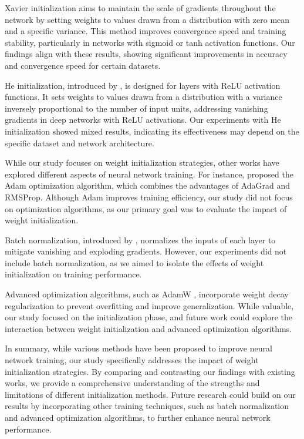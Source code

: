 \documentclass{article} %
\begin{document}
Xavier initialization aims to maintain the scale of gradients throughout the network by setting weights to values drawn from a distribution with zero mean and a specific variance. This method improves convergence speed and training stability, particularly in networks with sigmoid or tanh activation functions. Our findings align with these results, showing significant improvements in accuracy and convergence speed for certain datasets.

He initialization, introduced by \citet{He2015DelvingDI}, is designed for layers with ReLU activation functions. It sets weights to values drawn from a distribution with a variance inversely proportional to the number of input units, addressing vanishing gradients in deep networks with ReLU activations. Our experiments with He initialization showed mixed results, indicating its effectiveness may depend on the specific dataset and network architecture.

While our study focuses on weight initialization strategies, other works have explored different aspects of neural network training. For instance, \citet{kingma2014adam} proposed the Adam optimization algorithm, which combines the advantages of AdaGrad and RMSProp. Although Adam improves training efficiency, our study did not focus on optimization algorithms, as our primary goal was to evaluate the impact of weight initialization.

Batch normalization, introduced by \citet{ba2016layer}, normalizes the inputs of each layer to mitigate vanishing and exploding gradients. However, our experiments did not include batch normalization, as we aimed to isolate the effects of weight initialization on training performance.

Advanced optimization algorithms, such as AdamW \citep{loshchilov2017adamw}, incorporate weight decay regularization to prevent overfitting and improve generalization. While valuable, our study focused on the initialization phase, and future work could explore the interaction between weight initialization and advanced optimization algorithms.

In summary, while various methods have been proposed to improve neural network training, our study specifically addresses the impact of weight initialization strategies. By comparing and contrasting our findings with existing works, we provide a comprehensive understanding of the strengths and limitations of different initialization methods. Future research could build on our results by incorporating other training techniques, such as batch normalization and advanced optimization algorithms, to further enhance neural network performance.
\end{document}
